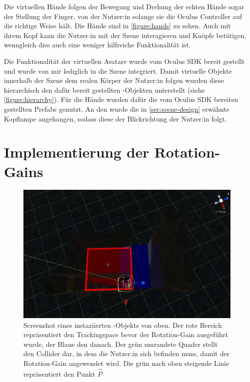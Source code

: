 Die virtuellen Hände folgen der Bewegung und Drehung der echten Hände sogar der Stellung der Finger, von der Nutzer:in solange sie die Oculus Controller auf die richtige Weise hält. Die Hände sind in \autoref{figure:hands} zu sehen.
Auch mit ihrem Kopf kann die Nutzer:in mit der Szene interagieren und Knöpfe betätigen, wenngleich dies auch eine weniger hilfreiche Funktionalität ist.

Die Funktionalität der virtuellen Avatare wurde vom Oculus SDK bereit gestellt und wurde von mir lediglich in die Szene integriert. %
Damit virtuelle Objekte innerhalb der Szene dem realen Körper der Nutzer:in folgen wurden diese hierarchisch den dafür bereit gestellten -Objekten unterstellt (siehe \autoref{figure:hierarchy}). Für die Hände wurden dafür die vom Oculus SDK bereiten gestellten Prefabs genutzt. %
An den  wurde die in \autoref{sec:scene-design} erwähnte Kopflampe angehangen, sodass diese der Blickrichtung der Nutzer:in folgt.

\section{Implementierung der Rotation-Gains}

\begin{figure}[!h]
    \centering
    \includegraphics[width=1\textwidth]{images/rotationredirector.png}
    \caption{Screenshot eines instaziierten -Objekts von oben. Der rote Bereich repräsentiert den Trackingspace bevor der Rotation-Gain ausgeführt wurde, der Blaue den danach. Der grün umrandete Quader stellt den Collider dar, in dem die Nutzer:in sich befinden muss, damit der Rotation-Gain angewendet wird. Die grün nach oben steigende Linie repräsentiert den Punkt $\vec{P}$}\label{figure:rotredirector}
\end{figure}

